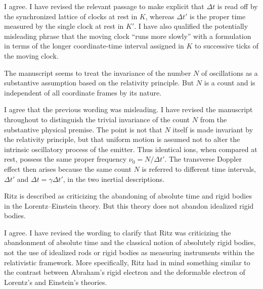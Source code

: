 \documentclass[submitted,11pt]{article}
\begin{document}
\begin{reply}
I agree. I have revised the relevant passage to make explicit that $\Delta t$ is read off by the synchronized lattice of clocks at rest in $K$, whereas $\Delta t'$ is the proper time measured by the single clock at rest in $K'$. I have also qualified the potentially misleading phrase that the moving clock ``runs more slowly'' with a formulation in terms of the longer coordinate-time interval assigned in $K$ to successive ticks of the moving clock.
\end{reply}

\begin{point}
The manuscript seems to treat the invariance of the number $N$ of oscillations as a substantive assumption based on the relativity principle. But $N$ is a count and is independent of all coordinate frames by its nature.
\end{point}

\begin{reply}
I agree that the previous wording was misleading. I have revised the manuscript throughout to distinguish the trivial invariance of the count $N$ from the substantive physical premise. The point is not that $N$ itself is made invariant by the relativity principle, but that uniform motion is assumed not to alter the intrinsic oscillatory process of the emitter. Thus identical ions, when compared at rest, possess the same proper frequency $\nu_0=N/\Delta t'$. The transverse Doppler effect then arises because the same count $N$ is referred to different time intervals, $\Delta t'$ and $\Delta t=\gamma\Delta t'$, in the two inertial descriptions.
\end{reply}

\begin{point}
Ritz is described as criticizing the abandoning of absolute time and rigid bodies in the Lorentz--Einstein theory. But this theory does not abandon idealized rigid bodies.
\end{point}

\begin{reply}
I agree. I have revised the wording to clarify that Ritz was criticizing the abandonment of absolute time and the classical notion of absolutely rigid bodies, not the use of idealized rods or rigid bodies as measuring instruments within the relativistic framework. More specifically, Ritz had in mind something similar to the contrast between Abraham's rigid electron and the deformable electron of Lorentz's and Einstein's theories.
\end{reply}
\end{document}

